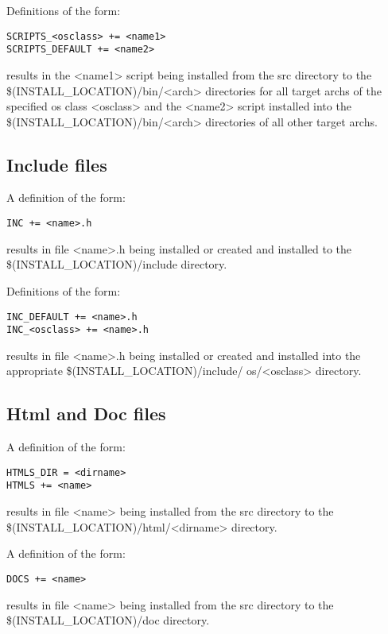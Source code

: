 Definitions of the form:

\begin{verbatim}SCRIPTS_<osclass> += <name1>
SCRIPTS_DEFAULT += <name2>
\end{verbatim}results in the \textless{}name1\textgreater{} script being installed from the src directory to the \$(INSTALL\_LOCATION)/bin/\textless{}arch\textgreater{} 
directories for all target archs of the specified os class \textless{}osclass\textgreater{} and the \textless{}name2\textgreater{} script installed into the 
\$(INSTALL\_LOCATION)/bin/\textless{}arch\textgreater{} directories of all other target archs.

\subsection{Include files}

A definition of the form:

\begin{verbatim}INC += <name>.h
\end{verbatim}results in file \textless{}name\textgreater{}.h being installed or created and installed to the \$(INSTALL\_LOCATION)/include directory. 

Definitions of the form:

\begin{verbatim}INC_DEFAULT += <name>.h
INC_<osclass> += <name>.h
\end{verbatim}results in file \textless{}name\textgreater{}.h being installed or created and installed into the appropriate \$(INSTALL\_LOCATION)/include/
os/\textless{}osclass\textgreater{} directory.

\subsection{Html and Doc files}

A definition of the form:

\begin{verbatim}HTMLS_DIR = <dirname>
HTMLS += <name>
\end{verbatim}results in file \textless{}name\textgreater{} being installed from the src directory to the \$(INSTALL\_LOCATION)/html/\textless{}dirname\textgreater{} directory. 

A definition of the form:

\begin{verbatim}DOCS += <name>
\end{verbatim}results in file \textless{}name\textgreater{} being installed from the src directory to the \$(INSTALL\_LOCATION)/doc directory. 

